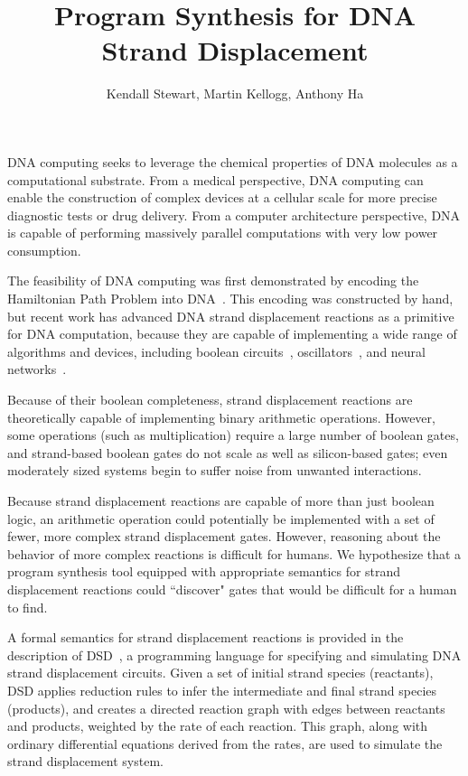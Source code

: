 \documentclass{article}
\begin{document}
\title{Program Synthesis for DNA Strand Displacement}
\author{Kendall Stewart, Martin Kellogg, Anthony Ha}

\maketitle

DNA computing seeks to leverage the chemical properties
of DNA molecules as a computational substrate.
From a medical perspective, DNA computing can enable the
construction of complex devices at a cellular scale for more precise
diagnostic tests or drug delivery. From a computer architecture perspective,
DNA is capable of performing massively parallel computations with very low
power consumption.

The feasibility of DNA computing was first demonstrated by encoding the
Hamiltonian Path Problem into DNA~\cite{adelman}. This encoding was constructed
by hand, but recent work has advanced DNA strand displacement reactions as a
primitive for DNA computation, because they are capable of implementing a wide
range of algorithms and devices, including boolean circuits~\cite{strands},
oscillators~\cite{dsd}, and neural networks~\cite{strandnn}.

Because of their boolean completeness, strand displacement reactions are
theoretically capable of implementing binary arithmetic operations. However,
some operations (such as multiplication) require a large number of
boolean gates, and strand-based boolean gates do not scale as well as
silicon-based gates; even moderately sized systems begin to suffer noise
from unwanted interactions.

Because strand displacement reactions are capable of more than just boolean
logic, an arithmetic operation could potentially be implemented with a set of
fewer, more complex strand displacement gates. However, reasoning about the
behavior of more complex reactions is difficult for humans. We hypothesize that
a program synthesis tool equipped with appropriate semantics for strand
displacement reactions could ``discover" gates that would be difficult for a
human to find.

A formal semantics for strand displacement reactions is provided in the
description of DSD~\cite{dsd}, a programming language for specifying and
simulating DNA strand displacement circuits. Given a set of initial strand
species (reactants), DSD applies reduction rules to infer the intermediate and
final strand species (products), and creates a directed reaction graph with
edges between reactants and products, weighted by the rate of each reaction.
This graph, along with ordinary differential equations derived from the rates,
are used to simulate the strand displacement system.
\end{document}
